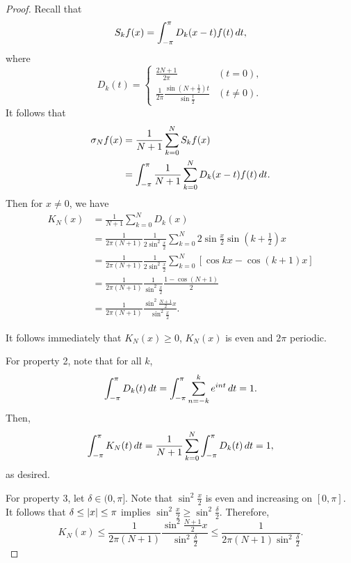 \documentclass[a4paper]{article}
\begin{document}
\begin{proof}
  Recall that
  \[
    S_k f(x) = \int_{-\pi}^\pi D_k(x - t) f(t) \, d t,
  \]
  where
  \[
    D_k(t) = \begin{cases}
      \frac{2 N + 1}{2 \pi} & (t = 0),    \\
      \frac{1}{2\pi} \frac{\sin (N + \frac{1}{2})t}{\sin \frac{t}{2}}
                            & (t \neq 0).
    \end{cases}
  \]
  It follows that
  \[
    \begin{aligned}
      \sigma_N f(x)
       & = \frac{1}{N+1} \sum_{k=0}^N S_k f(x)                              \\
       & = \int_{-\pi}^\pi \frac{1}{N+1} \sum_{k=0}^N D_k(x - t) f(t) \, d t.
    \end{aligned}
  \]
  Then for $x \neq 0$, we have
  \[
    \begin{aligned}
      K_N(x)
       & = \frac{1}{N+1} \sum_{k=0}^N D_k(x)                                \\
       & = \frac{1}{2\pi (N+1)} \frac{1}{2 \sin^2 \frac{x}{2}}
      \sum_{k=0}^N 2 \sin \frac{x}{2} \sin \left( k + \frac{1}{2} \right) x \\
       & = \frac{1}{2\pi (N+1)} \frac{1}{2 \sin^2 \frac{x}{2}}
      \sum_{k=0}^N \left[ \cos k x - \cos(k + 1) x \right]                  \\
       & = \frac{1}{2\pi (N + 1)} \frac{1}{\sin^2 \frac{x}{2}}
      \frac{1 - \cos(N + 1)}{2}                                             \\
       & = \frac{1}{2\pi (N+1)} \frac{\sin^2 \frac{N+1}{2} x}{\sin^2
                                  \frac{x}{2}}.
    \end{aligned}
  \]

  It follows immediately that $K_N(x) \geq 0$, $K_N(x)$
  is even and $2\pi$ periodic.

  For property 2,
  note that for all $k$,
  \[
    \int_{-\pi}^\pi D_k(t) \, d t
    = \int_{-\pi}^\pi \sum_{n=-k}^k e^{i n t} \, d t
    = 1.
  \]
  Then,
  \[
    \int_{-\pi}^\pi K_N(t) \, d t
    = \frac{1}{N+1} \sum_{k=0}^N \int_{-\pi}^\pi D_k(t) \, d t
    = 1,
  \]
  as desired.

  For property 3, let $\delta \in (0, \pi]$. Note that
  $\sin^2 \frac{x}{2}$ is even and increasing on
  $[0, \pi]$. It follows that $\delta \leq \left\lvert x\right\rvert \leq \pi$
  implies $\sin^2 \frac{x}{2} \geq \sin^2 \frac{\delta}{2}$.
  Therefore,
  \[
    K_N(x) \leq \frac{1}{2\pi (N+1)} \frac{\sin^2 \frac{N+1}{2}x}
    {\sin^2 \frac{\delta}{2}}
    \leq \frac{1}{2 \pi (N+1) \sin^2 \frac{\delta}{2}}.
  \]
\end{proof}
\end{document}
